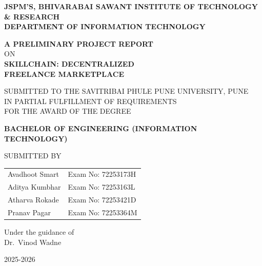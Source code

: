 
\thispagestyle{empty}
\begin{titlepage}
\centering

{\large\bfseries JSPM'S, BHIVARABAI SAWANT INSTITUTE OF TECHNOLOGY\\ \& RESEARCH}\\[0.3em]
{\large\bfseries DEPARTMENT OF INFORMATION TECHNOLOGY}

\vspace{1.5cm}

{\Large\bfseries A PRELIMINARY PROJECT REPORT}\\[0.4em]
{\large ON}\\[0.4em]

{\LARGE\bfseries SKILLCHAIN: DECENTRALIZED\\ FREELANCE MARKETPLACE}

\vspace{1.5cm}

SUBMITTED TO THE SAVITRIBAI PHULE PUNE UNIVERSITY, PUNE\\
IN PARTIAL FULFILLMENT OF REQUIREMENTS\\
FOR THE AWARD OF THE DEGREE

\vspace{0.8cm}

\textbf{BACHELOR OF ENGINEERING (INFORMATION TECHNOLOGY)}

\vspace{1.2cm}

SUBMITTED BY

\vspace{0.8cm}

\begin{tabular}{p{5cm}p{5cm}}
Avadhoot Smart  & Exam No: 72253173H \\[0.3em]
Aditya Kumbhar  & Exam No: 72253163L \\[0.3em]
Atharva Rokade  & Exam No: 72253421D\\[0.3em]
Pranav Pagar    & Exam No: 72253364M\\
\end{tabular}

\vspace{1.2cm}

Under the guidance of\\
Dr.\ Vinod Wadne

\vfill

{\large 2025-2026}

\end{titlepage}
